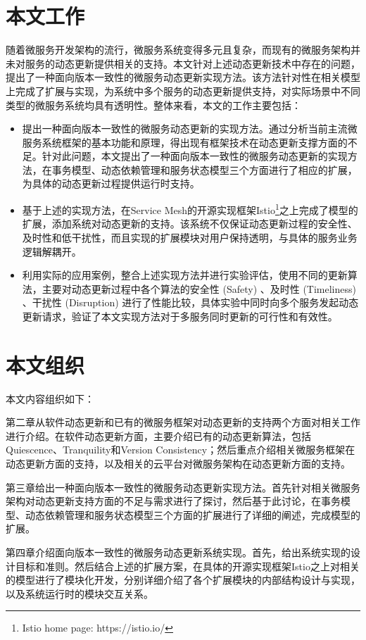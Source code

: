 \documentclass[macfonts,master]{njuthesis}
\begin{document}
\section{本文工作}
随着微服务开发架构的流行，微服务系统变得多元且复杂，而现有的微服务架构并未对服务的动态更新提供相关的支持。本文针对上述动态更新技术中存在的问题，提出了一种面向版本一致性的微服务动态更新实现方法。该方法针对性在相关模型上完成了扩展与实现，为系统中多个服务的动态更新提供支持，对实际场景中不同类型的微服务系统均具有透明性。整体来看，本文的工作主要包括：

\begin{itemize}
	\item 提出一种面向版本一致性的微服务动态更新的实现方法。通过分析当前主流微服务系统框架的基本功能和原理，得出现有框架技术在动态更新支撑方面的不足。针对此问题，本文提出了一种面向版本一致性的微服务动态更新的实现方法，在事务模型、动态依赖管理和服务状态模型三个方面进行了相应的扩展，为具体的动态更新过程提供运行时支持。
	\item 基于上述的实现方法，在Service Mesh的开源实现框架Istio\footnote{Istio home page: https://istio.io/}之上完成了模型的扩展，添加系统对动态更新的支持。该系统不仅保证动态更新过程的安全性、及时性和低干扰性，而且实现的扩展模块对用户保持透明，与具体的服务业务逻辑解耦开。
	\item 利用实际的应用案例，整合上述实现方法并进行实验评估，使用不同的更新算法，主要对动态更新过程中各个算法的安全性 (Safety) 、及时性 (Timeliness) 、干扰性 (Disruption) 进行了性能比较，具体实验中同时向多个服务发起动态更新请求，验证了本文实现方法对于多服务同时更新的可行性和有效性。
\end{itemize}

\section{本文组织}
本文内容组织如下：

第二章从软件动态更新和已有的微服务框架对动态更新的支持两个方面对相关工作进行介绍。在软件动态更新方面，主要介绍已有的动态更新算法，包括Quiescence、Tranquility和Version Consistency；然后重点介绍相关微服务框架在动态更新方面的支持，以及相关的云平台对微服务架构在动态更新方面的支持。

第三章给出一种面向版本一致性的微服务动态更新实现方法。首先针对相关微服务架构对动态更新支持方面的不足与需求进行了探讨，然后基于此讨论，在事务模型、动态依赖管理和服务状态模型三个方面的扩展进行了详细的阐述，完成模型的扩展。

第四章介绍面向版本一致性的微服务动态更新系统实现。首先，给出系统实现的设计目标和准则。然后结合上述的扩展方案，在具体的开源实现框架Istio之上对相关的模型进行了模块化开发，分别详细介绍了各个扩展模块的内部结构设计与实现，以及系统运行时的模块交互关系。
\end{document}
